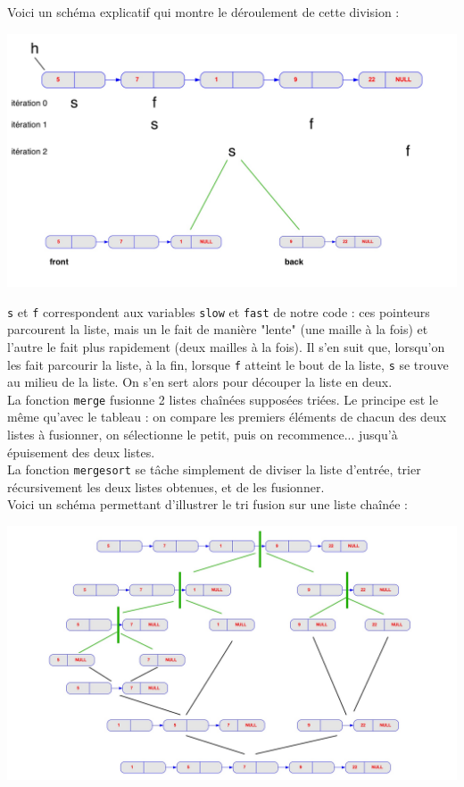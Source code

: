 \documentclass[11pt]{article}
\begin{document}
Voici un schéma explicatif qui montre le déroulement de cette division : 

\begin{center}
\includegraphics[scale=0.25]{images/2.jpg}
\end{center}

\texttt{s} et \texttt{f} correspondent aux variables \texttt{slow} et \texttt{fast} de notre code : ces pointeurs parcourent la liste, mais un le fait de manière "lente" (une maille à la fois) et l'autre le fait plus rapidement (deux mailles à la fois). Il s'en suit que, lorsqu'on les fait parcourir la liste, à la fin, lorsque \texttt{f} atteint le bout de la liste, \texttt{s} se trouve au milieu de la liste. On s'en sert alors pour découper la liste en deux. \\


La fonction \texttt{merge} fusionne 2 listes chaînées supposées triées. Le principe est le même qu'avec le tableau : on compare les premiers éléments de chacun des deux listes à fusionner, on sélectionne le petit, puis on recommence... jusqu'à épuisement des deux listes. \\

La fonction \texttt{merge\textunderscore sort} se tâche simplement de diviser la liste d'entrée, trier récursivement les deux listes obtenues, et de les fusionner. \\

Voici un schéma permettant d'illustrer le tri fusion sur une liste chaînée :

\begin{center}
\includegraphics[scale=0.25]{images/1.jpg}
\end{center}
\end{document}
